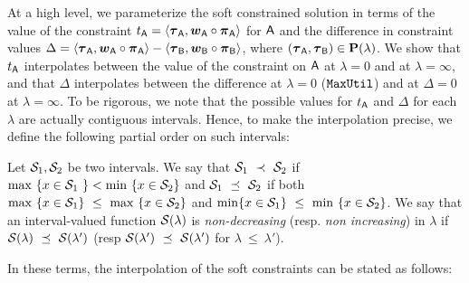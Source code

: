 	At a high level, we parameterize the soft constrained solution in terms of the value of the constraint $t_{\mathsf{A}} =\langle \boldsymbol{\tau}_{\mathsf{A}},\boldsymbol{w}_{\mathsf{A}} \circ \boldsymbol{\pi}_{\mathsf{A}} \rangle$ for $\mathsf{A}$ and the difference in constraint values $\Delta =\langle \boldsymbol{\tau}_{\mathsf{A}},\boldsymbol{w}_{\mathsf{A}} \circ \boldsymbol{\pi}_{\mathsf{A}} \rangle - \langle \boldsymbol{\tau}_{\mathsf{B}},\boldsymbol{w}_{\mathsf{B}} \circ \boldsymbol{\pi}_{\mathsf{B}} \rangle$, where $(\boldsymbol{\tau}_{\mathsf{A}},\boldsymbol{\tau}_{\mathsf{B}}) \in \mathbf{P}(\lambda)$. We show that $t_{\mathsf{A}}$ interpolates between the value of the constraint on $\mathsf{A}$ at $\lambda = 0$ and at $\lambda = \infty$, and that $\Delta$ interpolates between the difference at $\lambda = 0$ ($\mathtt{MaxUtil}$) and at $\Delta = 0$ at $\lambda = \infty$. To be rigorous, we note that the possible values for $t_{\mathsf{A}}$ and $\Delta$ for each $\lambda$ are actually contiguous intervals. Hence, to make the interpolation precise, we define the following partial order on such intervals:
	\begin{defn} Let $\mathcal{S}_1,\mathcal{S}_2$ be two intervals. We say that $\mathcal{S}_1~\prec~\mathcal{S}_2$ if $\max~\{x \in \mathcal{S}_1~\} < \min~\{x \in \mathcal{S}_2\}$ and  $\mathcal{S}_1~\preceq~ \mathcal{S}_2$ if both $\max~\{x \in \mathcal{S}_1 \}~\le~\max~\{x \in \mathcal{S}_2\}$ and $\min \{x \in \mathcal{S}_1 \}~\le~\min~\{x \in \mathcal{S}_2\}$.	We say that an interval-valued function $\mathcal{S}(\lambda)$ is \emph{non-decreasing} (resp. \emph{non increasing}) in $\lambda$ if $\mathcal{S}(\lambda)~\preceq~\mathcal{S}(\lambda')$ (resp $\mathcal{S}(\lambda ')~\preceq~\mathcal{S}(\lambda')$ for $\lambda~ \le~\lambda'$). 
	\end{defn}
	In these terms, the interpolation of the soft constraints can be stated as follows:
